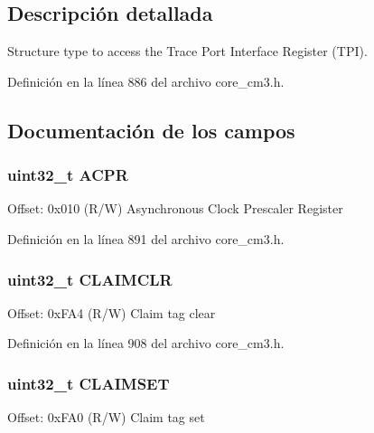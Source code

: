\subsection{Descripción detallada}
Structure type to access the Trace Port Interface Register (T\+PI). 

Definición en la línea 886 del archivo core\+\_\+cm3.\+h.



\subsection{Documentación de los campos}
\subsubsection[{\texorpdfstring{A\+C\+PR}{ACPR}}]{ uint32\+\_\+t A\+C\+PR}\hypertarget{struct_t_p_i___type_a4bdbe4ff58983d940ca72d8733feaedd}{}\label{struct_t_p_i___type_a4bdbe4ff58983d940ca72d8733feaedd}
Offset\+: 0x010 (R/W) Asynchronous Clock Prescaler Register 

Definición en la línea 891 del archivo core\+\_\+cm3.\+h.

\subsubsection[{\texorpdfstring{C\+L\+A\+I\+M\+C\+LR}{CLAIMCLR}}]{ uint32\+\_\+t C\+L\+A\+I\+M\+C\+LR}\hypertarget{struct_t_p_i___type_a9c887c45efeb6fef9b6a9ab5bc490f62}{}\label{struct_t_p_i___type_a9c887c45efeb6fef9b6a9ab5bc490f62}
Offset\+: 0x\+F\+A4 (R/W) Claim tag clear 

Definición en la línea 908 del archivo core\+\_\+cm3.\+h.

\subsubsection[{\texorpdfstring{C\+L\+A\+I\+M\+S\+ET}{CLAIMSET}}]{ uint32\+\_\+t C\+L\+A\+I\+M\+S\+ET}\hypertarget{struct_t_p_i___type_a72a4fb10cf406fa6af1740e3bf6c2e41}{}\label{struct_t_p_i___type_a72a4fb10cf406fa6af1740e3bf6c2e41}
Offset\+: 0x\+F\+A0 (R/W) Claim tag set 

